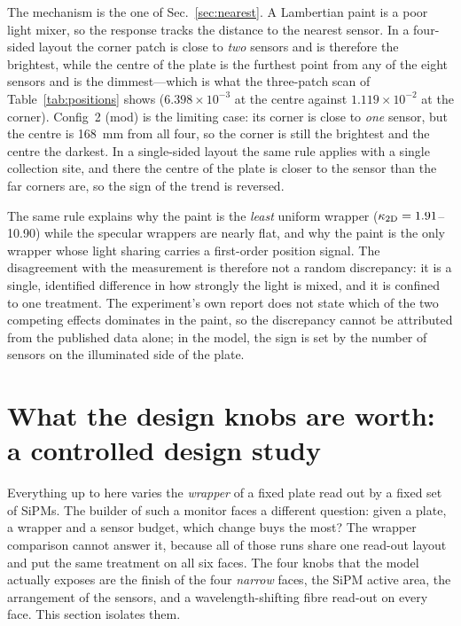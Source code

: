 \documentclass[11pt,a4paper]{article}
\begin{document}
The mechanism is the one of Sec.~\ref{sec:nearest}. A Lambertian paint is a
poor light mixer, so the response tracks the distance to the nearest sensor.
In a four-sided layout the corner patch is close to \emph{two} sensors and is
therefore the brightest, while the centre of the plate is the furthest point
from any of the eight sensors and is the dimmest---which is what the
three-patch scan of Table~\ref{tab:positions} shows
($6.398\times10^{-3}$ at the centre against $1.119\times10^{-2}$ at the
corner). Config~2 (mod) is the limiting case: its corner is close to
\emph{one} sensor, but the centre is \SI{168}{\milli\meter} from all four, so
the corner is still the brightest and the centre the darkest. In a
single-sided layout the same rule applies with a single collection site, and
there the centre of the plate is closer to the sensor than the far corners
are, so the sign of the trend is reversed.

The same rule explains why the paint is the \emph{least} uniform wrapper
($\kappa_{\rm 2D} = \num{1.91}$--\num{10.90}) while the specular wrappers are
nearly flat, and why the paint is the only wrapper whose light sharing
carries a first-order position signal. The disagreement with the measurement
is therefore not a random discrepancy: it is a single, identified difference in
how strongly the light is mixed, and it is confined to one treatment. The
experiment's own report does not state which of the two competing effects
dominates in the paint, so the discrepancy cannot be attributed from the
published data alone; in the model, the sign is set by the number of sensors
on the illuminated side of the plate.

\section{What the design knobs are worth: a controlled design study}
\label{sec:design}

Everything up to here varies the \emph{wrapper} of a fixed plate read out by
a fixed set of SiPMs. The builder of such a monitor faces a different
question: given a plate, a wrapper and a sensor budget, which change buys the
most? The wrapper comparison cannot answer it, because all of those runs share
one read-out layout and put the same treatment on all six faces. The four
knobs that the model actually exposes are the finish of the four \emph{narrow}
faces, the SiPM active area, the arrangement of the sensors, and a
wavelength-shifting fibre read-out on every face. This section isolates them.
\end{document}
